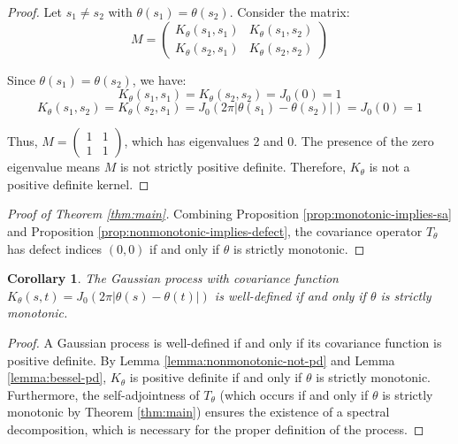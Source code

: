 \documentclass{article}
\newtheorem{corollary}[theorem]{Corollary}
\begin{document}
\begin{proof}
Let $s_1 \neq s_2$ with $\theta(s_1) = \theta(s_2)$. Consider the matrix:
\begin{equation}
    M = 
    \begin{pmatrix}
        K_\theta(s_1,s_1) & K_\theta(s_1,s_2) \\
        K_\theta(s_2,s_1) & K_\theta(s_2,s_2)
    \end{pmatrix}
\end{equation}

Since $\theta(s_1) = \theta(s_2)$, we have:
\begin{equation}
    K_\theta(s_1,s_1) = K_\theta(s_2,s_2) = J_0(0) = 1
\end{equation}
\begin{equation}
    K_\theta(s_1,s_2) = K_\theta(s_2,s_1) = J_0(2\pi|\theta(s_1) - \theta(s_2)|) = J_0(0) = 1
\end{equation}

Thus, $M = \begin{pmatrix} 1 & 1 \\ 1 & 1 \end{pmatrix}$, which has eigenvalues 2 and 0. The presence of the zero eigenvalue means $M$ is not strictly positive definite. Therefore, $K_\theta$ is not a positive definite kernel.
\end{proof}

\begin{proof}[Proof of Theorem \ref{thm:main}]
Combining Proposition \ref{prop:monotonic-implies-sa} and Proposition \ref{prop:nonmonotonic-implies-defect}, the covariance operator $T_\theta$ has defect indices $(0,0)$ if and only if $\theta$ is strictly monotonic.
\end{proof}

\begin{corollary}
The Gaussian process with covariance function $K_\theta(s,t) = J_0(2\pi|\theta(s) - \theta(t)|)$ is well-defined if and only if $\theta$ is strictly monotonic.
\end{corollary}

\begin{proof}
A Gaussian process is well-defined if and only if its covariance function is positive definite. By Lemma \ref{lemma:nonmonotonic-not-pd} and Lemma \ref{lemma:bessel-pd}, $K_\theta$ is positive definite if and only if $\theta$ is strictly monotonic. Furthermore, the self-adjointness of $T_\theta$ (which occurs if and only if $\theta$ is strictly monotonic by Theorem \ref{thm:main}) ensures the existence of a spectral decomposition, which is necessary for the proper definition of the process.
\end{proof}
\end{document}
